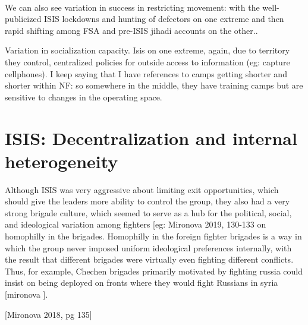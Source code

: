 ~\autocite{muhaysini2019capital}



We can also see variation in success in restricting movement:  with the well-publicized ISIS lockdowns and hunting of defectors on one extreme and then rapid shifting among FSA and pre-ISIS jihadi accounts on the other..

Variation in socialization capacity. Isis on one extreme, again, due to territory they control, centralized policies for outside access to information (eg: capture cellphones). 
I keep saying that I have references to camps getting shorter and shorter within NF: so somewhere in the middle, they have training camps but are sensitive to changes in the operating space. 


\section{ISIS: Decentralization and internal heterogeneity}

Although ISIS was very aggressive about limiting exit opportunities, which should give the leaders more ability to control the group, they also had a very strong brigade culture, which seemed to serve as a hub for the political, social, and ideological variation among fighters [eg: Mironova 2019, 130-133 on homophilly in the brigades. Homophilly in the foreign fighter brigades is a way in which the group never imposed uniform ideological preferences internally, with the result that different brigades were virtually even fighting different conflicts. Thus, for example, Chechen brigades primarily motivated by fighting russia could insist on being deployed on fronts where they would fight Russians in syria [mironova ].

 [Mironova 2018, pg 135]


